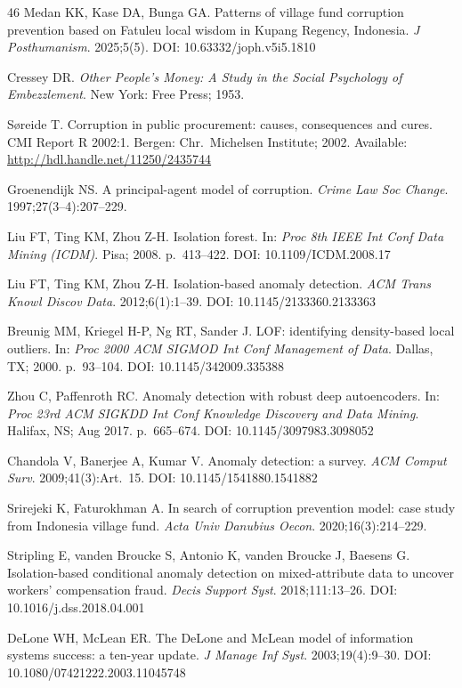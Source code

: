 \documentclass[3p,times,procedia]{elsarticle}
\begin{document}
\begin{thebibliography}{46}
Medan KK, Kase DA, Bunga GA. Patterns of village fund corruption prevention based on Fatuleu local wisdom in Kupang Regency, Indonesia. \textit{J Posthumanism}. 2025;5(5). DOI: 10.63332/joph.v5i5.1810

Cressey DR. \textit{Other People's Money: A Study in the Social Psychology of Embezzlement}. New York: Free Press; 1953.

S{\o}reide T. Corruption in public procurement: causes, consequences and cures. CMI Report R 2002:1. Bergen: Chr.\ Michelsen Institute; 2002. Available: \url{http://hdl.handle.net/11250/2435744}

Groenendijk NS. A principal-agent model of corruption. \textit{Crime Law Soc Change}. 1997;27(3--4):207--229.

Liu FT, Ting KM, Zhou Z-H. Isolation forest. In: \textit{Proc 8th IEEE Int Conf Data Mining (ICDM)}. Pisa; 2008. p.\ 413--422. DOI: 10.1109/ICDM.2008.17

Liu FT, Ting KM, Zhou Z-H. Isolation-based anomaly detection. \textit{ACM Trans Knowl Discov Data}. 2012;6(1):1--39. DOI: 10.1145/2133360.2133363

Breunig MM, Kriegel H-P, Ng RT, Sander J. LOF: identifying density-based local outliers. In: \textit{Proc 2000 ACM SIGMOD Int Conf Management of Data}. Dallas, TX; 2000. p.\ 93--104. DOI: 10.1145/342009.335388

Zhou C, Paffenroth RC. Anomaly detection with robust deep autoencoders. In: \textit{Proc 23rd ACM SIGKDD Int Conf Knowledge Discovery and Data Mining}. Halifax, NS; Aug 2017. p.\ 665--674. DOI: 10.1145/3097983.3098052

Chandola V, Banerjee A, Kumar V. Anomaly detection: a survey. \textit{ACM Comput Surv}. 2009;41(3):Art.~15. DOI: 10.1145/1541880.1541882

Srirejeki K, Faturokhman A. In search of corruption prevention model: case study from Indonesia village fund. \textit{Acta Univ Danubius Oecon}. 2020;16(3):214--229.

Stripling E, vanden Broucke S, Antonio K, vanden Broucke J, Baesens G. Isolation-based conditional anomaly detection on mixed-attribute data to uncover workers' compensation fraud. \textit{Decis Support Syst}. 2018;111:13--26. DOI: 10.1016/j.dss.2018.04.001

DeLone WH, McLean ER. The DeLone and McLean model of information systems success: a ten-year update. \textit{J Manage Inf Syst}. 2003;19(4):9--30. DOI: 10.1080/07421222.2003.11045748


\end{thebibliography}
\end{document}
